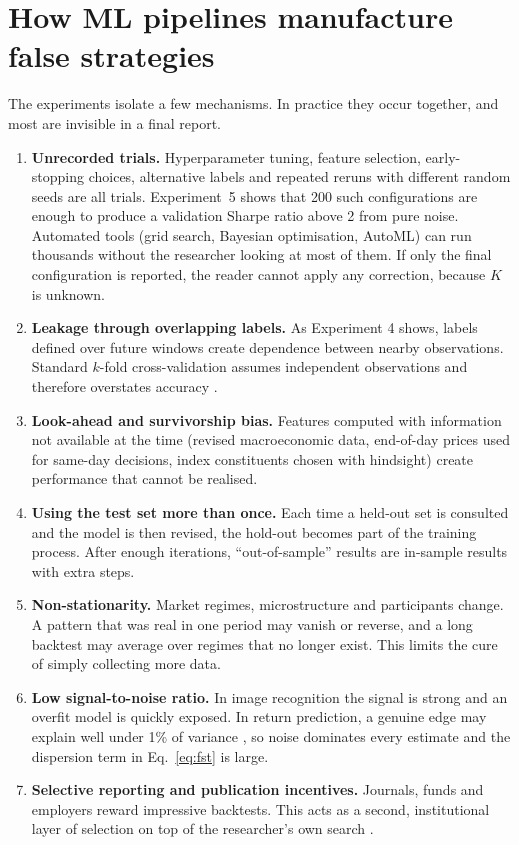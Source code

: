 \documentclass[11pt]{article}
\begin{document}
\section{How ML pipelines manufacture false strategies}\label{sec:ml}

The experiments isolate a few mechanisms. In practice they occur together, and most are invisible in a final report.

\begin{enumerate}[leftmargin=*]
\item \textbf{Unrecorded trials.} Hyperparameter tuning, feature selection, early-stopping choices, alternative labels and repeated reruns with different random seeds are all trials. Experiment~5 shows that 200 such configurations are enough to produce a validation Sharpe ratio above 2 from pure noise. Automated tools (grid search, Bayesian optimisation, AutoML) can run thousands without the researcher looking at most of them. If only the final configuration is reported, the reader cannot apply any correction, because $K$ is unknown.
\item \textbf{Leakage through overlapping labels.} As Experiment 4 shows, labels defined over future windows create dependence between nearby observations. Standard $k$-fold cross-validation assumes independent observations and therefore overstates accuracy \citep{lopezdeprado2018}.
\item \textbf{Look-ahead and survivorship bias.} Features computed with information not available at the time (revised macroeconomic data, end-of-day prices used for same-day decisions, index constituents chosen with hindsight) create performance that cannot be realised.
\item \textbf{Using the test set more than once.} Each time a held-out set is consulted and the model is then revised, the hold-out becomes part of the training process. After enough iterations, ``out-of-sample'' results are in-sample results with extra steps.
\item \textbf{Non-stationarity.} Market regimes, microstructure and participants change. A pattern that was real in one period may vanish or reverse, and a long backtest may average over regimes that no longer exist. This limits the cure of simply collecting more data.
\item \textbf{Low signal-to-noise ratio.} In image recognition the signal is strong and an overfit model is quickly exposed. In return prediction, a genuine edge may explain well under 1\% of variance \citep{gu2020}, so noise dominates every estimate and the dispersion term in Eq.~\eqref{eq:fst} is large.
\item \textbf{Selective reporting and publication incentives.} Journals, funds and employers reward impressive backtests. This acts as a second, institutional layer of selection on top of the researcher's own search \citep{harvey2016,ioannidis2005}.
\end{enumerate}
\end{document}
